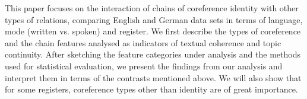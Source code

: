 This paper focuses on the interaction of chains of coreference identity with other types of relations, comparing English and German data sets in terms of language, mode (written vs. spoken) and register. We first describe the types of coreference and the chain features analysed as indicators of textual coherence and topic continuity. After sketching the feature categories under analysis and the methods used for statistical evaluation, we present the findings from our analysis and interpret them in terms of the contrasts mentioned above. We will also show that for some registers, coreference types other than identity are of great importance.
